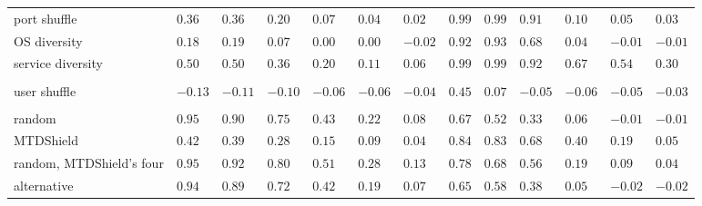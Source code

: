 \begin{table}[htbp]
\begin{tabular}{@{}P{4.25cm}*{12}{>{\centering\arraybackslash}p{0.74cm}}@{}}
    \quad port shuffle & $0.36$ & $0.36$ & $0.20$ & $0.07$ & $0.04$ & \textcolor{black!55}{$0.02$} & $0.99$ & $0.99$ & $0.91$ & $0.10$ & $0.05$ & \textcolor{black!55}{$0.03$} \\
    \quad OS diversity & $0.18$ & $0.19$ & $0.07$ & \textcolor{black!55}{$0.00$} & \textcolor{black!55}{$0.00$} & \textcolor{black!55}{$-0.02$} & $0.92$ & $0.93$ & $0.68$ & $0.04$ & \textcolor{black!55}{$-0.01$} & \textcolor{black!55}{$-0.01$} \\
    \quad service diversity & $0.50$ & $0.50$ & $0.36$ & $0.20$ & $0.11$ & $0.06$ & $0.99$ & $0.99$ & $0.92$ & $0.67$ & $0.54$ & $0.30$ \\
    \midrule
     \\
    \quad user shuffle & $-0.13$ & $-0.11$ & $-0.10$ & $-0.06$ & $-0.06$ & $-0.04$ & $0.45$ & $0.07$ & $-0.05$ & $-0.06$ & $-0.05$ & \textcolor{black!55}{$-0.03$} \\
    \midrule
     \\
    \quad random & $0.95$ & $0.90$ & $0.75$ & $0.43$ & $0.22$ & $0.08$ & $0.67$ & $0.52$ & $0.33$ & $0.06$ & \textcolor{black!55}{$-0.01$} & \textcolor{black!55}{$-0.01$} \\
    \quad MTDShield & $0.42$ & $0.39$ & $0.28$ & $0.15$ & $0.09$ & $0.04$ & $0.84$ & $0.83$ & $0.68$ & $0.40$ & $0.19$ & $0.05$ \\
    \quad random, MTDShield's four & $0.95$ & $0.92$ & $0.80$ & $0.51$ & $0.28$ & $0.13$ & $0.78$ & $0.68$ & $0.56$ & $0.19$ & $0.09$ & $0.04$ \\
    \quad alternative & $0.94$ & $0.89$ & $0.72$ & $0.42$ & $0.19$ & $0.07$ & $0.65$ & $0.58$ & $0.38$ & $0.05$ & \textcolor{black!55}{$-0.02$} & \textcolor{black!55}{$-0.02$} \\
    \bottomrule
  \end{tabular}
\end{table}
